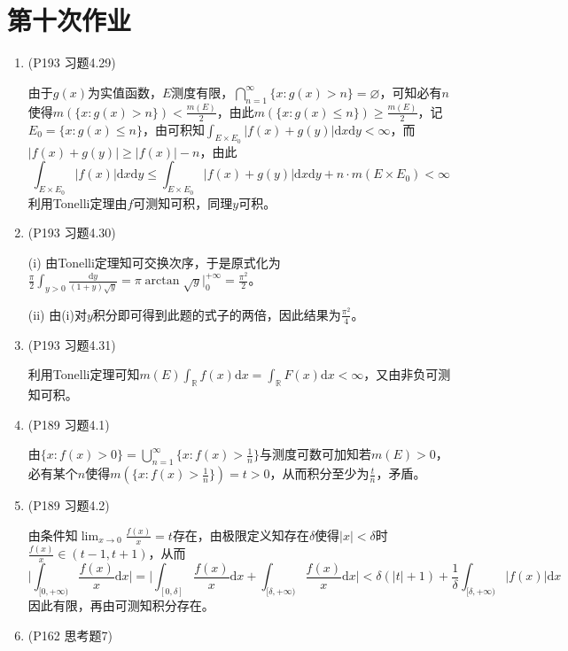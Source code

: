 \documentclass[a4paper,UTF8,fontset=windows]{ctexart}
\begin{document}
\section{第十次作业}
\begin{enumerate}
    \item (P193 习题4.29)
    
    由于$g(x)$为实值函数，$E$测度有限，$\bigcap_{n=1}^\infty\{x:g(x)>n\}=\varnothing$，可知必有$n$使得$m(\{x:g(x)>n\})<\frac{m(E)}{2}$，由此$m(\{x:g(x)\le n\})\ge\frac{m(E)}{2}$，记$E_0=\{x:g(x)\le n\}$，由可积知$\int_{E\times E_0}|f(x)+g(y)|\mathrm{d}x\mathrm{d}y<\infty$，而$|f(x)+g(y)|\ge |f(x)|-n$，由此
    \[\int_{E\times E_0}|f(x)|\mathrm{d}x\mathrm{d}y\le\int_{E\times E_0}|f(x)+g(y)|\mathrm{d}x\mathrm{d}y+n\cdot m(E\times E_0)<\infty\]
    利用Tonelli定理由$f$可测知可积，同理$y$可积。
    
    \item (P193 习题4.30)
    
    (i) 由Tonelli定理知可交换次序，于是原式化为$\frac{\pi}{2}\int_{y>0}\frac{\mathrm{d}y}{(1+y)\sqrt{y}}=\pi\arctan\sqrt{y}\big|_0^{+\infty}=\frac{\pi^2}{2}$。
    
    (ii) 由(i)对$y$积分即可得到此题的式子的两倍，因此结果为$\frac{\pi^2}{4}$。
    
    \item (P193 习题4.31)
    
    利用Tonelli定理可知$m(E)\int_\mathbb{R}f(x)\mathrm{d}x=\int_\mathbb{R}F(x)\mathrm{d}x<\infty$，又由非负可测知可积。
    
    \item (P189 习题4.1)
    
    由$\{x:f(x)>0\}=\bigcup_{n=1}^\infty\{x:f(x)>\frac{1}{n}\}$与测度可数可加知若$m(E)>0$，必有某个$n$使得$m(\{x:f(x)>\frac{1}{n}\})=t>0$，从而积分至少为$\frac{t}{n}$，矛盾。
    
    \item (P189 习题4.2)
    
    由条件知$\lim_{x\to0}\frac{f(x)}{x}=t$存在，由极限定义知存在$\delta$使得$|x|<\delta$时$\frac{f(x)}{x}\in(t-1,t+1)$，从而
    \[\bigg|\int_{[0,+\infty)}\frac{f(x)}{x}\mathrm{d}x\bigg|=\bigg|\int_{[0,\delta]}\frac{f(x)}{x}\mathrm{d}x+\int_{[\delta,+\infty)}\frac{f(x)}{x}\mathrm{d}x\bigg|<\delta(|t|+1)+\frac{1}{\delta}\int_{[\delta,+\infty)}|f(x)|\mathrm{d}x\]
    因此有限，再由可测知积分存在。
    
    \item (P162 思考题7)
    

\end{enumerate}
\end{document}
